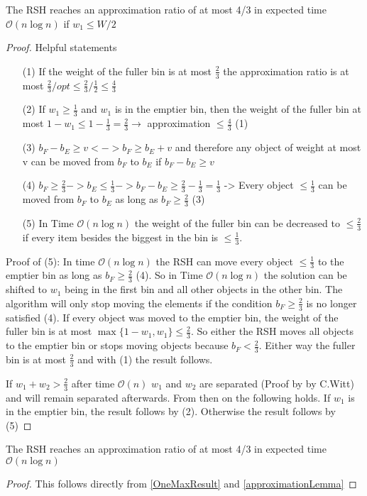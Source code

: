 \begin{lemma}\label{approximationLemma}
The RSH reaches an approximation ratio of at most 4/3 in expected time $\mathcal{O}(n\log{}n)$ if $w_1 \le W/2$ 
\end{lemma}
\begin{proof}
Helpful statements	
\begin{itemize}
    \item[(1)]\label{helpPoint1} If the weight of the fuller bin is at most $\frac{2}{3}$ the approximation ratio is at most \(\frac{2}{3} / opt \le \frac{2}{3} / \frac{1}{2} \le \frac{4}{3}\)
    \item[(2)]\label{helpPoint2} If \(w_1 \ge \frac{1}{3}\) and \(w_1\) is in the emptier bin, then the weight of the fuller bin at most \(1 - w_1 \le 1 - \frac{1}{3} = \frac{2}{3} \rightarrow\) approximation  \(\le \frac{4}{3}\) (1)
    \item[(3)]\label{helpPoint3} \(b_F - b_E \ge v <-> b_F \ge b_E + v\) and therefore any object of weight at most v can be moved from $b_F$ to $b_E$ if \(b_F - b_E \ge v\)
    \item[(4)]\label{helpPoint4} \(b_F \ge \frac{2}{3} -> b_E \le \frac{1}{3} -> b_F - b_E \ge \frac{2}{3} - \frac{1}{3} = \frac{1}{3}\) -> Every object \(\le \frac{1}{3}\) can be moved from $b_F$ to $b_E$ as long as \(b_F \ge \frac{2}{3}\) (3)
    \item[(5)]\label{helpPoint5} In Time $\mathcal{O}(n\log{}n)$ the weight of the fuller bin can be decreased to \(\le \frac{2}{3}\) if every item besides the biggest in the bin is $\le \frac{1}{3}$.
\end{itemize}
Proof of (5): \newline
In time $\mathcal{O}(n\log{}n)$ the RSH can move every object $\le \frac{1}{3}$ to the emptier bin as long as $b_F \ge \frac{2}{3}$ (4). So in Time $\mathcal{O}(n\log{}n)$ the solution can be shifted to $w_1$ being in the first bin and all other objects in the other bin. The algorithm will only stop moving the elements if the condition $b_F \ge \frac{2}{3}$ is no longer satisfied (4). If every object was moved to the emptier bin, the weight of the fuller bin is at most \(\max\{1-w_1, w_1\} \le \frac{2}{3}\). So either the RSH moves all objects to the emptier bin or stops moving objects because $b_F < \frac{2}{3}$. Either way the fuller bin is at most $\frac{2}{3}$ and with (1) the result follows.


If \(w_1+w_2 > \frac{2}{3}\) after time $\mathcal{O}(n)$ $w_1$ and $w_2$ are separated (Proof by by C.Witt) and will remain separated afterwards. From then on the following holds. If $w_1$ is in the emptier bin, the result follows by (2). Otherwise the result follows by (5)
\end{proof}

\begin{corollary}
    The RSH reaches an approximation ratio of at most 4/3 in expected time $\mathcal{O}(n\log{}n)$
\end{corollary}
\begin{proof}
    This follows directly from  \ref{OneMaxResult} and  \ref{approximationLemma}
\end{proof}